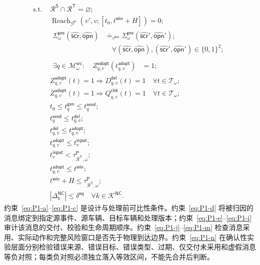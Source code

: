\documentclass[10pt,a4paper,twocolumn]{article}
\begin{document}
\begin{subequations}
\begin{align}
\mathrm{s.t.}\;&\mathcal R^{\mathsf S}\cap\mathcal R^{\mathsf T}=\varnothing;
\label{eq:P1-a}\\
&\operatorname{Reach}_{\mathcal G^{\mathsf P}}\!(v',v;[t_0,t^{\mathsf{win}}+H])=0;
\label{eq:P1-b}\\
&\begin{aligned}
\Sigma_{\omega}^{\mathsf{pre}}(\hat{\mathsf{scr}},\hat{\mathsf{opn}})
&\doteq_{\varepsilon^{\mathsf{pre}}}
\Sigma_{\omega}^{\mathsf{pre}}(\hat{\mathsf{scr}}',\hat{\mathsf{opn}}');\\
&\quad\forall(\hat{\mathsf{scr}},\hat{\mathsf{opn}}),(\hat{\mathsf{scr}}',\hat{\mathsf{opn}}')\in\{0,1\}^{2};
\end{aligned}
\label{eq:P1-c}\\
&\begin{aligned}
\exists q\in\mathcal M_{\omega}^{\mathsf{src}}:\quad
Z_{q,v}^{\mathsf{adopt}}(t_{q,v}^{\mathsf{adopt}})&=1;
\end{aligned}
\label{eq:P1-d}\\
&Z_{q,v}^{\mathsf{adopt}}(t)=1\Rightarrow D_{q,v}^{\mathsf{del}}(t)=1\quad\forall t\in\mathcal T_{\omega};
\label{eq:P1-e}\\
&Z_{q,v}^{\mathsf{adopt}}(t)=1\Rightarrow Q_{q,v}^{\mathsf{chk}}(t)=1\quad\forall t\in\mathcal T_{\omega};
\label{eq:P1-f}\\
&t_0\leq t_q^{\mathsf{gen}}\leq t_q^{\mathsf{send}};
\label{eq:P1-g}\\
&t_q^{\mathsf{send}}\leq t_{q,v}^{\mathsf{del}};
\label{eq:P1-h}\\
&t_{q,v}^{\mathsf{del}}\leq t_{q,v}^{\mathsf{adopt}};
\label{eq:P1-i}\\
&t_{q,v}^{\mathsf{adopt}}\leq t_v^{\mathsf{input}};
\label{eq:P1-j}\\
&t_v^{\mathsf{input}}<\tau_{\mathcal R^{\mathsf T},\omega}^{\mathsf P};
\label{eq:P1-k}\\
&t_{q,v}^{\mathsf{adopt}}\leq t^{\mathsf{win}};
\label{eq:P1-l}\\
&t^{\mathsf{win}}+H\leq\tau_{\mathcal R^{\mathsf T},\omega}^{\mathsf P};
\label{eq:P1-m}\\
&\left|\Delta_{k}^{\mathsf{NC}}\right|\leq\delta^{\mathsf{eq}}
\quad\forall k\in\mathcal K^{\mathsf{NC}}.
\label{eq:P1-n}
\end{align}
\end{subequations}
约束~\eqref{eq:P1-a}--\eqref{eq:P1-c} 是设计与处理前可比性条件。约束~\eqref{eq:P1-d} 将被归因的消息绑定到指定源事件、源车辆、目标车辆和处理版本；约束~\eqref{eq:P1-e}--\eqref{eq:P1-i} 审计该消息的交付、校验和生命周期顺序。约束~\eqref{eq:P1-j}--\eqref{eq:P1-m} 检查消息采用、实际动作和完整风险窗口是否先于物理到达边界。约束~\eqref{eq:P1-n} 在确认性实验层面分别检验错误来源、错误目标、错误类型、过期、仅交付未采用和虚假消息等负对照；每类负对照必须独立落入等效区间，不能先合并后判断。
\end{document}
